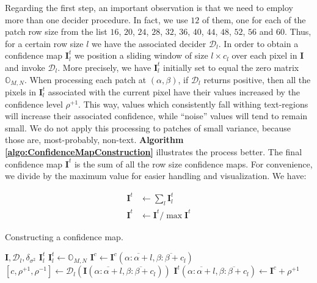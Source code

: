 \documentclass[12pt,a4paper,oneside,english]{UPBThesis}
\newcommand{\hctimes}[2]{{#1}\!\times\!{#2}}
\newcommand{\hcrange}[2]{\overline{{#1}\colon\!\!{#2}}}
\begin{document}
Regarding the first step, an important observation is that we need to employ more than one decider procedure. In fact, we use $12$ of them, one for each of the patch row size from the list $16$, $20$, $24$, $28$, $32$, $36$, $40$, $44$, $48$, $52$, $56$ and $60$. Thus, for a certain row size $l$ we have the associated decider $\mathcal{D}_l$. In order to obtain a confidence map $\textbf{I}_l^t$ we position a sliding window of size $\hctimes{l}{c_l}$ over each pixel in $\textbf{I}$ and invoke $\mathcal{D}_l$. More precisely, we have $\textbf{I}_l^t$ initially set to equal the zero matrix $\mathbb{O}_{M,N}$. When processing each patch at $(\alpha,\beta)$, if $\mathcal{D}_l$ returns positive, then all the pixels in $\textbf{I}_l^t$ associated with the current pixel have their values increased by the confidence level $\rho^{+1}$. This way, values which consistently fall withing text-regions will increase their associated confidence, while ``noise'' values will tend to remain small. We do not apply this processing to patches of small variance, because those are, most-probably, non-text. \textbf{Algorithm \ref{algo:ConfidenceMapConstruction}} illustrates the process better. The final confidence map $\textbf{I}^t$ is the sum of all the row size confidence maps. For convenience, we divide by the maximum value for easier handling and visualization. We have:

\begin{align*}
\textbf{I}^t & \gets \sum_{l} \textbf{I}_l^t \\
\textbf{I}^t & \gets \textbf{I}^t / \max{\textbf{I}^t}
\end{align*}

\begin{algorithm}
\caption{Constructing a confidence map.}
\label{algo:ConfidenceMapConstruction}
\begin{algorithmic}
\Require $\textbf{I},\mathcal{D}_l,\delta_{\sigma^2}$
\Ensure $\textbf{I}_l^t$
\State $\textbf{I}_l^t \gets \mathbb{O}_{M,N}$
\For {$\alpha = \hcrange{1}{M-l+1}$}
\For {$\beta = \hcrange{1}{N-c_l+1}$}
\State $\textbf{I}^c \gets \textbf{I}^c(\hcrange{\alpha}{\alpha+l},\hcrange{\beta}{\beta+c_l})$
\State $\left[c,\rho^{+1},\rho^{-1} \right] \gets \mathcal{D}_l(\textbf{I}(\hcrange{\alpha}{\alpha+l},\hcrange{\beta}{\beta+c_l}))$
\State $\textbf{I}^t(\hcrange{\alpha}{\alpha+l},\hcrange{\beta}{\beta+c_l}) \gets \textbf{I}^c + \rho^{+1}$
\EndIf
\EndIf
\EndFor
\EndFor
\end{algorithmic}
\end{algorithm}
\end{document}

